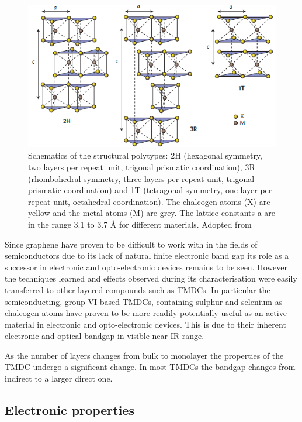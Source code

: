 \begin{figure}[h]
	\begin{center}
		\includegraphics[scale=0.7]{TMDCPolytypes.png}
		\caption{Schematics of the structural polytypes: 2H (hexagonal symmetry, two layers per repeat unit, trigonal prismatic coordination), 3R (rhombohedral symmetry, three layers per repeat unit, trigonal prismatic coordination) and 1T (tetragonal symmetry, one layer per repeat unit, octahedral coordination). The chalcogen atoms (X) are yellow and the metal atoms (M) are grey. The lattice constants a are in the range 3.1 to 3.7 \r{A} for different materials. Adopted from \cite{ElectronicsAndOptoelectronicsOfTwo-dimensionalTransitionMetalDichalcogenides}}
		\label{fig:TMDCPolytypes}
	\end{center}
\end{figure}

Since graphene have proven to be difficult to work with in the fields of semiconductors due to its lack of natural finite electronic band gap its role as a successor in electronic and opto-electronic devices remains to be seen. However the techniques learned and effects observed during its characterisation were easily transferred to other layered compounds such as TMDCs. In particular the semiconducting, group VI-based TMDCs, containing sulphur and selenium as chalcogen atoms have proven to be more readily potentially useful as an active material in electronic and opto-electronic devices. This is due to their inherent electronic and optical bandgap in visible-near IR range. 
	
As the number of layers changes from bulk to monolayer the properties of the TMDC undergo a significant change. In most TMDCs the bandgap changes from indirect to a larger direct one. 
	
\subsection{Electronic properties}
\label{subsec:Electronic properties}
	
